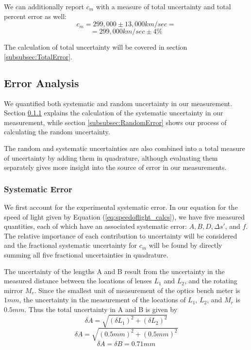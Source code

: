\documentclass[twocolumn]{article}
\begin{document}
	We can additionally report $c_m$ with a measure of total uncertainty and total percent error as well:
	\begin{equation*}
		c_m = 299,000\pm 13,000 km/sec = 
	\end{equation*}
	\begin{equation}
		= 299,000km/sec\pm 4\%
	\end{equation}
	
	The calculation of total uncertainty will be covered in section \ref{subsubsec:TotalError}.
	
	\subsection{Error Analysis} \label{subsec:error}
	We quantified both systematic and random uncertainty in our measurement.
	Section \ref{subsubsec:SystematicError} explains the calculation of the systematic uncertainty in our measurement, while section \ref{subsubsec:RandomError} shows our process of calculating the random uncertainty.
	
	The random and systematic uncertainties are also combined into a total measure of uncertainty by adding them in quadrature, although evaluating them separately gives more insight into the source of error in our measurements.
	
	\subsubsection{Systematic Error} \label{subsubsec:SystematicError}
		We first account for the experimental systematic error.
		In our equation for the speed of light given by Equation (\ref{eq:speedoflight_calcs}), we have five measured quantities, each of which have an associated systematic error: $A, B, D, \Delta s'$, and $f$.
		The relative importance of each contribution to uncertainty will be considered and the fractional systematic uncertainty for $c_m$ will be found by directly summing all five fractional uncertainties in quadrature.
		
		The uncertainty of the lengths A and B result from the uncertainty in the measured distance between the locations of lenses $L_1$ and $L_2$, and the rotating mirror $M_r$.
		Since the smallest unit of measurement of the optics bench meter is $1mm$, the uncertainty in the measurement of the locations of $L_1$, $L_2$, and $M_r$ is $0.5mm$. Thus the total uncertainty in A and B is given by
		\begin{equation*}
			\delta A = \sqrt{(\delta L_1)^2 + (\delta L_2)^2}
		\end{equation*}
		\begin{equation*}
			\delta A = \sqrt{(0.5mm)^2 + (0.5mm)^2}
		\end{equation*}
		\begin{equation}
			\delta A = \delta B = 0.71mm
		\end{equation}
		
\end{document}
